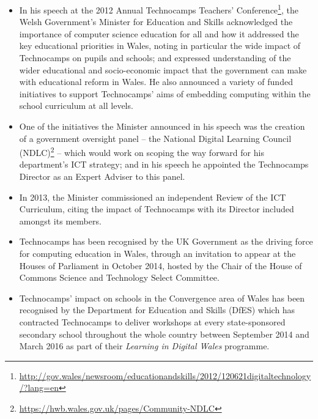 \documentclass{llncs}
\begin{document}
\begin{itemize}

\item In his speech at the 2012 Annual Technocamps Teachers'
Conference\footnote{\url{http://gov.wales/newsroom/educationandskills/2012/120621digitaltechnology/?lang=en}},
the Welsh Government's Minister for Education and Skills acknowledged
the importance of computer science education for all and how it
addressed the key educational priorities in Wales, noting in
particular the wide impact of Technocamps on pupils and schools; and
expressed understanding of the wider educational and socio-economic
impact that the government can make with educational reform in
Wales. He also announced a variety of funded initiatives to support
Technocamps' aims of embedding computing within the school curriculum
at all levels.

\item One of the initiatives the Minister announced in his speech was
the creation of a government oversight panel -- the National
Digital Learning Council
(NDLC)\footnote{\url{https://hwb.wales.gov.uk/pages/Community-NDLC}}
-- which would work on scoping the way forward for his department's
ICT strategy; and in his speech he appointed the
Technocamps Director as an Expert Adviser to this panel.

\item In 2013, the Minister commissioned an independent Review of the ICT
Curriculum, citing the impact of Technocamps with its Director
included amongst its members.


\item Technocamps has been recognised by the UK Government as the driving
force for computing education in Wales, through an invitation to
appear at the Houses of Parliament in October 2014, hosted by the
Chair of the House of Commons Science and Technology Select Committee.

\item Technocamps' impact on schools in the Convergence area
of Wales has been recognised by the Department for Education and Skills (DfES)
which has contracted Technocamps to deliver workshops at every
state-sponsored secondary school throughout the whole country between
September 2014 and March 2016 as part of their \emph{Learning in
Digital Wales} programme.


\end{itemize}
\end{document}
